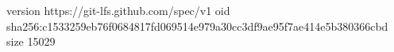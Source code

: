 version https://git-lfs.github.com/spec/v1
oid sha256:c1533259eb76f0684817fd069514e979a30cc3df9ae95f7ae414e5b380366cbd
size 15029
